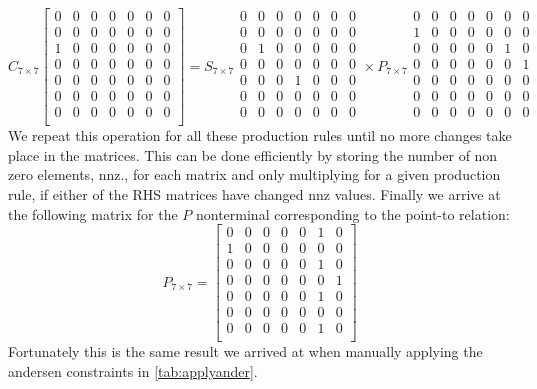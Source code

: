 \[
    C_{7\times 7}
    \begin{bmatrix}
        0 & 0 & 0 & 0 & 0 & 0 & 0 \\
        0 & 0 & 0 & 0 & 0 & 0 & 0 \\
        1 & 0 & 0 & 0 & 0 & 0 & 0 \\
        0 & 0 & 0 & 0 & 0 & 0 & 0 \\
        0 & 0 & 0 & 0 & 0 & 0 & 0 \\
        0 & 0 & 0 & 0 & 0 & 0 & 0 \\
        0 & 0 & 0 & 0 & 0 & 0 & 0 \\
    \end{bmatrix}
    =
    S_{7\times 7}
    \begin{smallmatrix}
        0 & 0 & 0 & 0 & 0 & 0 & 0 \\
        0 & 0 & 0 & 0 & 0 & 0 & 0 \\
        0 & 1 & 0 & 0 & 0 & 0 & 0 \\
        0 & 0 & 0 & 0 & 0 & 0 & 0 \\
        0 & 0 & 0 & 1 & 0 & 0 & 0 \\
        0 & 0 & 0 & 0 & 0 & 0 & 0 \\
        0 & 0 & 0 & 0 & 0 & 0 & 0 \\
    \end{smallmatrix}
    \times
    P_{7\times 7}
    \begin{smallmatrix}
        0 & 0 & 0 & 0 & 0 & 0 & 0 \\
        1 & 0 & 0 & 0 & 0 & 0 & 0 \\
        0 & 0 & 0 & 0 & 0 & 1 & 0 \\
        0 & 0 & 0 & 0 & 0 & 0 & 1 \\
        0 & 0 & 0 & 0 & 0 & 0 & 0 \\
        0 & 0 & 0 & 0 & 0 & 0 & 0 \\
        0 & 0 & 0 & 0 & 0 & 0 & 0 \\
    \end{smallmatrix}
\]
We repeat this operation for all these production rules until no more changes take place in the matrices.
This can be done efficiently by storing the number of non zero elements, nnz., for each matrix and only multiplying for a given production rule, if either of the RHS matrices have changed nnz values.
Finally we arrive at the following matrix for the $P$ nonterminal corresponding to the point-to relation:
\[
    P_{7\times 7} =
    \begin{bmatrix}
        0 & 0 & 0 & 0 & 0 & 1 & 0 \\
        1 & 0 & 0 & 0 & 0 & 0 & 0 \\
        0 & 0 & 0 & 0 & 0 & 1 & 0 \\
        0 & 0 & 0 & 0 & 0 & 0 & 1 \\
        0 & 0 & 0 & 0 & 0 & 1 & 0 \\
        0 & 0 & 0 & 0 & 0 & 0 & 0 \\
        0 & 0 & 0 & 0 & 0 & 1 & 0 \\
    \end{bmatrix}
\]
Fortunately this is the same result we arrived at when manually applying the andersen constraints in \autoref{tab:applyander}.


